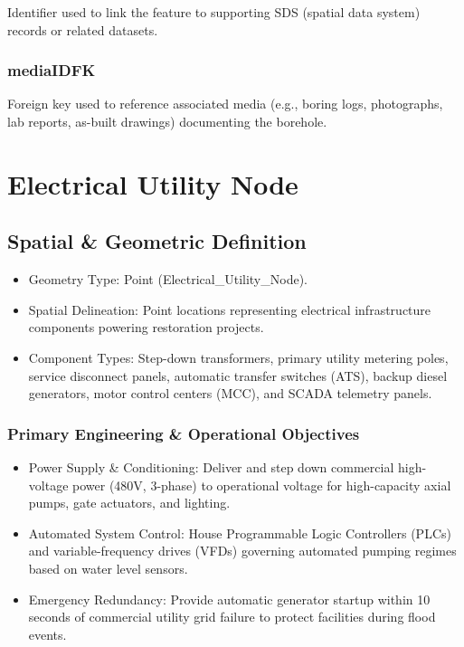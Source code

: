 \documentclass[
  letterpaper,
  DIV=11,
  numbers=noendperiod]{scrreprt}
\begin{document}
Identifier used to link the feature to supporting SDS (spatial data
system) records or related datasets.

\subsection{mediaIDFK}\label{mediaidfk-18}

Foreign key used to reference associated media (e.g., boring logs,
photographs, lab reports, as-built drawings) documenting the borehole.

\chapter{Electrical Utility Node}\label{electrical-utility-node}

\section{Spatial \& Geometric
Definition}\label{spatial-geometric-definition-19}

\begin{itemize}
\item
  Geometry Type: Point (Electrical\_Utility\_Node).
\item
  Spatial Delineation: Point locations representing electrical
  infrastructure components powering restoration projects.
\item
  Component Types: Step-down transformers, primary utility metering
  poles, service disconnect panels, automatic transfer switches (ATS),
  backup diesel generators, motor control centers (MCC), and SCADA
  telemetry panels.
\end{itemize}

\subsection{Primary Engineering \& Operational
Objectives}\label{primary-engineering-operational-objectives-1}

\begin{itemize}
\item
  Power Supply \& Conditioning: Deliver and step down commercial
  high-voltage power (480V, 3-phase) to operational voltage for
  high-capacity axial pumps, gate actuators, and lighting.
\item
  Automated System Control: House Programmable Logic Controllers (PLCs)
  and variable-frequency drives (VFDs) governing automated pumping
  regimes based on water level sensors.
\item
  Emergency Redundancy: Provide automatic generator startup within 10
  seconds of commercial utility grid failure to protect facilities
  during flood events.
\end{itemize}
\end{document}
